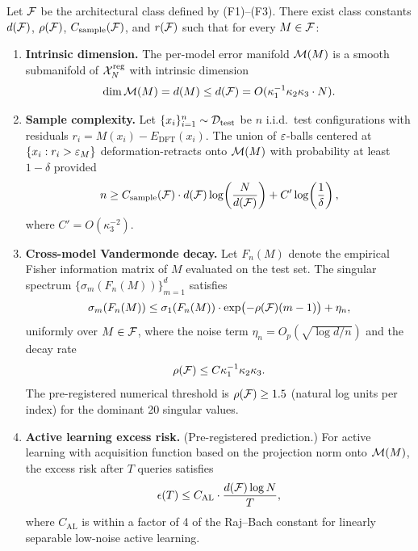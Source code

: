 \begin{theorem}\label{thm:main}
Let $\mathcal{F}$ be the architectural class defined by (F1)--(F3). There exist class constants $d(\mathcal{F})$, $\rho(\mathcal{F})$, $C_{\text{sample}}(\mathcal{F})$, and $r(\mathcal{F})$ such that for every $M \in \mathcal{F}$:

\begin{enumerate}[label=(\roman*)]
    \item \textbf{Intrinsic dimension.} The per-model error manifold $\mathcal{M}(M)$ is a smooth submanifold of $\mathcal{X}_N^{\text{reg}}$ with intrinsic dimension
    \begin{equation}\label{eq:intrinsic-dim}
        \dim \mathcal{M}(M) = d(M) \leq d(\mathcal{F}) = O(\kappa_1^{-1} \kappa_2 \kappa_3 \cdot N).
    \end{equation}

    \item \textbf{Sample complexity.} Let $\{x_i\}_{i=1}^n \sim \mathcal{D}_{\text{test}}$ be $n$ i.i.d.\ test configurations with residuals $r_i = M(x_i) - E_{\text{DFT}}(x_i)$. The union of $\varepsilon$-balls centered at $\{x_i : r_i > \varepsilon_M\}$ deformation-retracts onto $\mathcal{M}(M)$ with probability at least $1-\delta$ provided
    \begin{equation}\label{eq:sample-complexity}
        n \geq C_{\text{sample}}(\mathcal{F}) \cdot d(\mathcal{F}) \log\!\left(\frac{N}{d(\mathcal{F})}\right) + C' \log\!\left(\frac{1}{\delta}\right),
    \end{equation}
    where $C' = O(\kappa_3^{-2})$.

    \item \textbf{Cross-model Vandermonde decay.} Let $F_n(M)$ denote the empirical Fisher information matrix of $M$ evaluated on the test set. The singular spectrum $\{\sigma_m(F_n(M))\}_{m=1}^d$ satisfies
    \begin{equation}\label{eq:vandermonde}
        \sigma_m(F_n(M)) \leq \sigma_1(F_n(M)) \cdot \exp\bigl(-\rho(\mathcal{F})(m-1)\bigr) + \eta_n,
    \end{equation}
    uniformly over $M \in \mathcal{F}$, where the noise term $\eta_n = O_p(\sqrt{\log d / n})$ and the decay rate
    \begin{equation}\label{eq:rho-bound}
        \rho(\mathcal{F}) \leq C \kappa_1^{-1} \kappa_2 \kappa_3.
    \end{equation}
    The pre-registered numerical threshold is $\rho(\mathcal{F}) \geq 1.5$ (natural log units per index) for the dominant 20 singular values.

    \item \textbf{Active learning excess risk.} (Pre-registered prediction.) For active learning with acquisition function based on the projection norm onto $\mathcal{M}(M)$, the excess risk after $T$ queries satisfies
    \begin{equation}\label{eq:al-risk}
        \epsilon(T) \leq C_{\text{AL}} \cdot \frac{d(\mathcal{F}) \log N}{T},
    \end{equation}
    where $C_{\text{AL}}$ is within a factor of 4 of the Raj--Bach\cite{raj2022convergence} constant for linearly separable low-noise active learning.


\end{enumerate}
\end{theorem}

